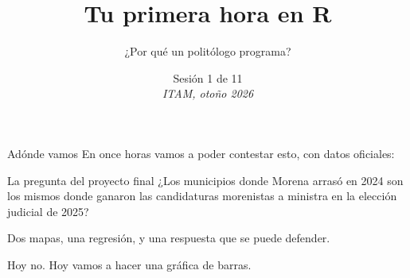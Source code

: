 %



\title[Lab de R · Sesión 1]{Tu primera hora en R}
\subtitle{¿Por qué un politólogo programa?}
\date{%
  Sesión 1 de 11\\[0.3em]
  \textit{ITAM, otoño 2026}%
}



{
\begin{frame}
  \titlepage
\end{frame}}


\begin{frame}{Adónde vamos}
  \vspace{0.2em}
  En once horas vamos a poder contestar esto, con datos oficiales:

  \vspace{0.9em}
  \begin{block}{La pregunta del proyecto final}
    ¿Los municipios donde Morena arrasó en 2024 son los mismos donde ganaron
    las candidaturas morenistas a ministra en la elección judicial de 2025?
  \end{block}

  \vspace{0.9em}
  Dos mapas, una regresión, y una respuesta que se puede defender.

  \vspace{0.5em}
  {\small\color{grisTenue}Hoy no. Hoy vamos a hacer una gráfica de barras.}
\end{frame}

